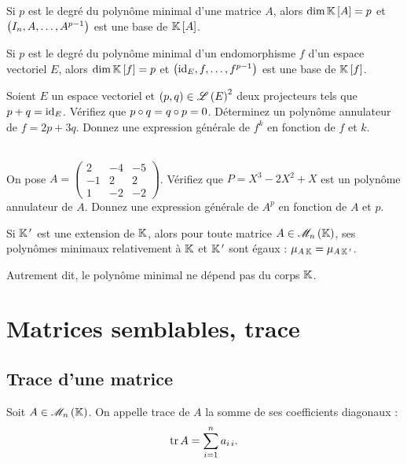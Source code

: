 \begin{prop}
Si \(p\) est le degré du polynôme minimal d'une matrice \(A\), alors \(\dim\poly[\K][A]=p\) et \(\left(I_n,A,\dots,A^{p-1}\right)\) est une base de \(\poly[\K][A]\).

Si \(p\) est le degré du polynôme minimal d'un endomorphisme \(f\) d'un espace vectoriel \(E\), alors \(\dim\poly[\K][f]=p\) et \(\left(\mathrm{id}_{E},f,\dots,f^{p-1}\right)\) est une base de \(\poly[\K][f]\).
\end{prop}

\begin{exo}
Soient \(E\) un espace vectoriel et \(\left(p,q\right)\in\mathscr{L}\left(E\right)^2\) deux projecteurs tels que \(p+q=\mathrm{id}_{E}\). Vérifiez que \(p\circ q=q\circ p=0\). Déterminez un polynôme annulateur de \(f=2p+3q\). Donnez une expression générale de \(f^k\) en fonction de \(f\) et \(k\).
\end{exo}

\begin{exo}~\\
On pose \(A=\begin{pmatrix}
2 & -4 & -5 \\
-1 & 2 & 2 \\
1 & -2 & -2
\end{pmatrix}\). Vérifiez que \(P=X^3-2X^2+X\) est un polynôme annulateur de \(A\). Donnez une expression générale de \(A^p\) en fonction de \(A\) et \(p\).
\end{exo}

\begin{cor}
Si \(\mathbb{K}^{\,\prime}\) est une extension de \(\mathbb{K}\), alors pour toute matrice \(A\in\M{n}\), ses polynômes minimaux relativement à \(\mathbb{K}\) et \(\mathbb{K}^{\,\prime}\) sont égaux : \(\mu_{A\,\mathbb{K}}=\mu_{A\,\mathbb{K}^{\,\prime}}\).

Autrement dit, le polynôme minimal ne dépend pas du corps \(\mathbb{K}\).
\end{cor}

\section{Matrices semblables, trace}

\subsection{Trace d'une matrice}

\begin{defi}
Soit \(A\in\M{n}\). On appelle trace de \(A\) la somme de ses coefficients diagonaux : \[\operatorname{tr} A=\sum_{i=1}^na_{i\,i}.\]
\end{defi}

